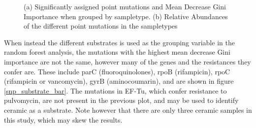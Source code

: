 
\begin{figure}[h]
    \centering
    \caption{(a) Significantly assigned point mutations and Mean Decrease Gini Importance when grouped by sampletype. (b) Relative Abundances of the different point mutations in the sampletypes}
    \label{snps_sampletype}
\end{figure}

When instead the different substrates is used as the grouping variable in the random forest analysis, the mutations with the highest mean decrease Gini importance are not the same, however many of the genes and the resistances they confer are. These include parC (fluoroquinolones), rpoB (rifampicin), rpoC (rifampicin or vancomycin), gyrB (aminocoumarin), and are shown in figure \ref{snp_substrate_bar}. The mutations in EF-Tu, which confer resistance to pulvomycin, are not present in the previous plot, and may be used to identify ceramic as a substrate. Note however that there are only three ceramic samples in this study, which may skew the results.

